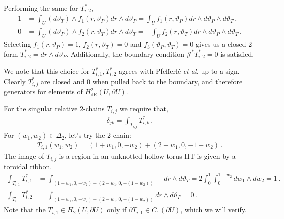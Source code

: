 \documentclass[11pt]{article}
\theoremstyle{plain}
\theoremstyle{definition}
\theoremstyle{remark}
\newcommand{\HT}{\mathrm{HT}}
\begin{document}
Performing the same for \(T_{i,2}^*\),
\begin{align*}
    1 &= \int_U (d \vartheta_T )  \wedge f_1(r, \vartheta_P) d r \wedge d \vartheta_P = \int_U f_1(r, \vartheta_P)  d r \wedge d \vartheta_P \wedge d \vartheta_T  \, , \\
    0 &= \int_U (d \vartheta_P )  \wedge f_2(r, \vartheta_T) d r \wedge d \vartheta_T = - \int_U f_2(r, \vartheta_T) d r \wedge d \vartheta_P \wedge d \vartheta_T  \, .
\end{align*}
Selecting \(f_1(r, \vartheta_P) =  1\), \(f_2(r, \vartheta_T) = 0\) and \(f_3(\vartheta_P, \vartheta_T) = 0\) gives us a closed 2-form \(T_{i,2}^* = d r \wedge d \vartheta_P  \). Additionally, the boundary condition \(\mathcal{J}^*T_{i,2}^* = 0  \) is satisfied. 

We note that this choice for \(T_{i,1}^*, T_{i,2}^*\) agrees with Pfefferl\'e \emph{et al.} \cite{Gauge_freedom} up to a sign. Clearly \(T_{i, j}^*\) are closed and 0 when pulled back to the boundary, and therefore generators for elements of \(H^2_{\mathrm{dR}}(U, \partial U)\). 


For the singular relative 2-chains \(T_{i, j}\) we require that,
\begin{align*}
    \delta_{jk} =  \int_{T_{i, j}} T_{i, k}^* \, . 
\end{align*}
For \((w_1, w_2) \in  \Delta_2\), let's try the 2-chain:
\begin{align*}
    T_{i,1} (w_1, w_2) = ( 1 + w_1, 0, -  w_2    ) + ( 2 - w_1, 0, -1+w_2    ) \, . 
\end{align*}
The image of \(T_{i, j}\) is a region in an unknotted hollow torus \(\HT\) is given by a toroidal ribbon. 
\begin{align*}
        \int_{T_{i,1}} T_{i,1}^* &= \int_{( 1 + w_1, 0, -     w_2    ) + ( 2 - w_1, 0, -    (1-w_2)    )} - dr \wedge d \vartheta_T 
     =    2 \int_0^1 \int_0^{1-w_2}   d w_1 \wedge d  w_2 %
     =     1     \, .  \\
        \int_{T_{i,1}} T_{i,2}^* &= \int_{( 1 + w_1, 0, -     w_2    ) + ( 2 - w_1, 0, -    (1-w_2)    )}  dr \wedge d \vartheta_P = 0 \, . %
\end{align*}
Note that the \( T_{i,1} \in H_2( U, \partial U )\) only if \(\partial T_{i,1} \in C_1 (\partial U) \), which we will verify. 
\end{document}
